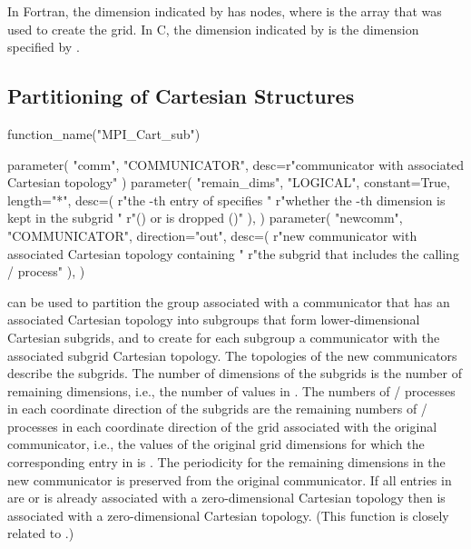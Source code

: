 \begin{users}
In Fortran, the dimension indicated by  has\flushline
{} nodes, where
 is the array that
was used to create the grid.  In C, the dimension
indicated by  is the dimension specified by
.
\end{users}

\subsection{Partitioning of Cartesian Structures}
\label{subsec:topol-part}

\begin{mpi-binding}
    function_name("MPI_Cart_sub")
    
    parameter(
        "comm", "COMMUNICATOR", desc=r"communicator with associated Cartesian topology"
    )
    parameter(
        "remain_dims",
        "LOGICAL",
        constant=True,
        length="*",
        desc=(
            r"the -th entry of  specifies "
            r"whether the -th dimension is kept in the subgrid "
            r"() or is dropped ()"
        ),
    )
    parameter(
        "newcomm",
        "COMMUNICATOR",
        direction="out",
        desc=(
            r"new communicator with associated Cartesian topology containing "
            r"the subgrid that includes the calling \MPI/ process"
        ),
    )
\end{mpi-binding}

 can be used to partition the
group associated with a communicator that has an associated Cartesian topology
into subgroups that form lower-dimensional Cartesian
subgrids, and to create for each subgroup a communicator with the associated
subgrid Cartesian topology.
The topologies of the new communicators describe the subgrids.
The number of dimensions of the subgrids is the number of remaining dimensions, i.e., the number of  values in .
The numbers of \MPI/ processes in each coordinate direction of the subgrids are the remaining numbers of \MPI/ processes in each coordinate direction of the grid associated with the original communicator, i.e., the values of the original grid dimensions for which the corresponding entry in  is .
The periodicity for the remaining dimensions in the new communicator is preserved from the original communicator.
If all entries in  are  or  is already associated
with a zero-dimensional Cartesian topology then  is associated
with a zero-dimensional Cartesian topology. 
(This function is closely related to
.)

